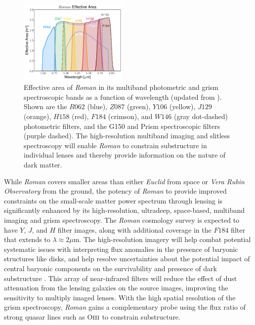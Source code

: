 \documentclass[11pt]{article}
\newcommand{\RST}{\emph{Roman}\xspace}
\begin{document}
\begin{figure}
\begin{center}
\includegraphics[width=0.47\textwidth]{roman_effective_area_color.pdf}
\end{center}
\caption{Effective area of \RST in its multiband photometric and grism spectroscopic bands as a function of wavelength (updated from \citep[Akeson et al. 2019][]{akeson2019a}). Shown are the $R062$ (blue), $Z087$ (green), $Y106$ (yellow), $J129$ (orange), $H158$ (red), $F184$ (crimson), and $W146$ (gray dot-dashed) photometric filters, and the G150 and Prism spectroscopic filters (purple dashed). The high-resolution multiband imaging and slitless spectroscopy will enable \RST to constrain substructure in individual lenses and thereby provide information on the nature of dark matter.}
\label{fig:effective_area}
\end{figure}

While \RST covers smaller areas than either \emph{Euclid} from space or \emph{Vera Rubin Observatory} from the ground, the potency of \RST to provide improved constraints on the small-scale matter power spectrum
through lensing is significantly enhanced by its high-resolution, ultradeep, space-based, multiband imaging
and grism spectroscopy. The \RST cosmology survey is expected to have $Y$, $J$, and $H$ filter
images, along with additional coverage in the $F184$ filter that extends to $\lambda\approx2\mu$m.
The high-resolution imagery will help combat potential systematic issues with interpreting
flux anomalies in the presence of baryonic structures like disks\citep{hsueh2017a}, and
help resolve uncertainties about the potential impact of central baryonic components on the
survivability and presence of dark substructure \citep{fiacconi2016a,garrison-kimmel2017a,graus2018a}.
This array of near-infrared filters will reduce the effect of dust attenuation from the lensing
galaxies on the source images, improving the sensitivity to multiply imaged lenses. With the
high spatial resolution of the
grism spectroscopy, \RST gains a complementary probe using the flux ratio of strong quasar lines
such as O${\textsc{iii}}$ to constrain substructure\citep{nierenberg2017a,simon2019a}.
\end{document}
